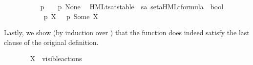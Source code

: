 \begin{isabellebody}
\ \ {\isacharparenleft}{\kern0pt}{\isachardoublequoteopen}{\isacharunderscore}{\kern0pt}\ {\isasymTTurnstile}\ {\isacharunderscore}{\kern0pt}{\isachardoublequoteclose}\ {\isacharbrackleft}{\kern0pt}{}{}{\isacharcomma}{\kern0pt}\ {}{}{\isacharbrackright}{\kern0pt}\ {}{}{\isacharparenright}{\kern0pt}\isanewline
\ \ \ {\isacartoucheopen}p\ {\isasymTTurnstile}\ {\isasymphi}\ {\isasymequiv}\ p\ {\isasymTTurnstile}{\isacharquery}{\kern0pt}{\isacharbrackleft}{\kern0pt}None{\isacharbrackright}{\kern0pt}\ {\isasymphi}{\isacartoucheclose}\isanewline
{}\isamarkupfalse%
\ HMLt{\isacharunderscore}{\kern0pt}sat{\isacharunderscore}{\kern0pt}stable\ {\isacharcolon}{\kern0pt}{\isacharcolon}{\kern0pt}\ {\isacartoucheopen}{\isacharprime}{\kern0pt}s{\isasymRightarrow}{\isacharprime}{\kern0pt}a\ set{\isasymRightarrow}{\isacharparenleft}{\kern0pt}{\isacharprime}{\kern0pt}a{\isacharparenright}{\kern0pt}HMLt{\isacharunderscore}{\kern0pt}formula\ {\isasymRightarrow}\ bool{\isacartoucheclose}\isanewline
\ \ {\isacharparenleft}{\kern0pt}{\isachardoublequoteopen}{\isacharunderscore}{\kern0pt}\ {\isasymTTurnstile}{\isacharbrackleft}{\kern0pt}{\isacharunderscore}{\kern0pt}{\isacharbrackright}{\kern0pt}\ {\isacharunderscore}{\kern0pt}{\isachardoublequoteclose}\ {\isacharbrackleft}{\kern0pt}{}{}{\isacharcomma}{\kern0pt}\ {}{}{\isacharcomma}{\kern0pt}\ {}{}{\isacharbrackright}{\kern0pt}\ {}{}{\isacharparenright}{\kern0pt}\isanewline
\ \ \ {\isacartoucheopen}p\ {\isasymTTurnstile}{\isacharbrackleft}{\kern0pt}X{\isacharbrackright}{\kern0pt}\ {\isasymphi}\ {\isasymequiv}\ p\ {\isasymTTurnstile}{\isacharquery}{\kern0pt}{\isacharbrackleft}{\kern0pt}Some\ X{\isacharbrackright}{\kern0pt}\ {\isasymphi}{\isacartoucheclose}%
\begin{isamarkuptext}%
Lastly, we show (by induction over \isa{{\isasymphi}}) that the function  does indeed satisfy the last clause of the original definition.%
\end{isamarkuptext}\isamarkuptrue%
%
\isadelimunimportant
%
\endisadelimunimportant
%
\isatagunimportant
%
\endisatagunimportant
{\isafoldunimportant}%
%
\isadelimunimportant
\isanewline
%
\endisadelimunimportant
{}\isamarkupfalse%
\isanewline
\ \ \ \isanewline
\ \ \ \ {\isacartoucheopen}X\ {\isasymsubseteq}\ visible{\isacharunderscore}{\kern0pt}actions{\isacartoucheclose}\isanewline

\end{isabellebody}

